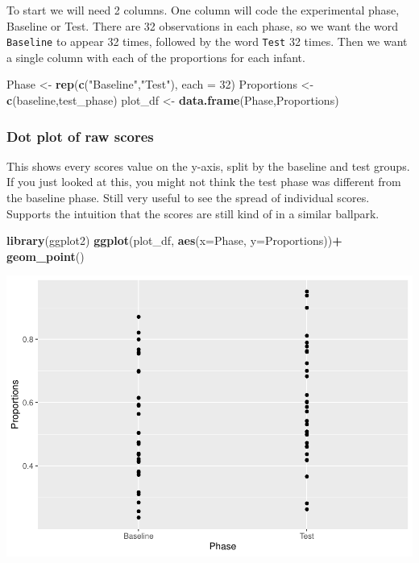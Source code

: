 \documentclass[
]{book}
\newenvironment{Shaded}{\begin{snugshade}}{\end{snugshade}}
\newcommand{\AttributeTok}[1]{\textcolor[rgb]{0.13,0.29,0.53}{#1}}
\newcommand{\DecValTok}[1]{\textcolor[rgb]{0.00,0.00,0.81}{#1}}
\newcommand{\FunctionTok}[1]{\textcolor[rgb]{0.13,0.29,0.53}{\textbf{#1}}}
\newcommand{\NormalTok}[1]{#1}
\newcommand{\OtherTok}[1]{\textcolor[rgb]{0.56,0.35,0.01}{#1}}
\newcommand{\SpecialCharTok}[1]{\textcolor[rgb]{0.81,0.36,0.00}{\textbf{#1}}}
\newcommand{\StringTok}[1]{\textcolor[rgb]{0.31,0.60,0.02}{#1}}
\begin{document}
To start we will need 2 columns. One column will code the experimental phase, Baseline or Test. There are 32 observations in each phase, so we want the word \texttt{Baseline} to appear 32 times, followed by the word \texttt{Test} 32 times. Then we want a single column with each of the proportions for each infant.

\begin{Shaded}
\begin{Highlighting}[]
\NormalTok{Phase }\OtherTok{\textless{}{-}} \FunctionTok{rep}\NormalTok{(}\FunctionTok{c}\NormalTok{(}\StringTok{"Baseline"}\NormalTok{,}\StringTok{"Test"}\NormalTok{), }\AttributeTok{each =} \DecValTok{32}\NormalTok{)}
\NormalTok{Proportions }\OtherTok{\textless{}{-}} \FunctionTok{c}\NormalTok{(baseline,test\_phase)}
\NormalTok{plot\_df }\OtherTok{\textless{}{-}} \FunctionTok{data.frame}\NormalTok{(Phase,Proportions)}
\end{Highlighting}
\end{Shaded}

\hypertarget{dot-plot-of-raw-scores}{%
\subsubsection{Dot plot of raw scores}\label{dot-plot-of-raw-scores}}

This shows every scores value on the y-axis, split by the baseline and test groups. If you just looked at this, you might not think the test phase was different from the baseline phase. Still very useful to see the spread of individual scores. Supports the intuition that the scores are still kind of in a similar ballpark.

\begin{Shaded}
\begin{Highlighting}[]
\FunctionTok{library}\NormalTok{(ggplot2)}
\FunctionTok{ggplot}\NormalTok{(plot\_df, }\FunctionTok{aes}\NormalTok{(}\AttributeTok{x=}\NormalTok{Phase, }\AttributeTok{y=}\NormalTok{Proportions))}\SpecialCharTok{+}
  \FunctionTok{geom\_point}\NormalTok{()}
\end{Highlighting}
\end{Shaded}

\includegraphics{Statistics_Lab_files/figure-latex/unnamed-chunk-175-1.pdf}
\end{document}
